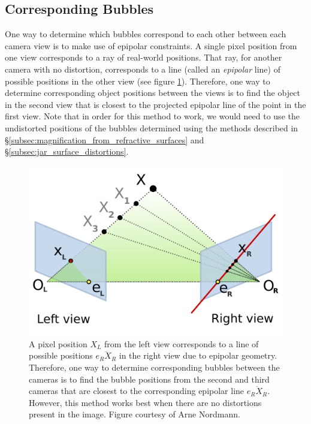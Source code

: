 \documentclass[11pt, letterpaper]{extarticle} %
\begin{document}
\subsection{Corresponding Bubbles} \label{subsec:corresponding_bubbles}
One way to determine which bubbles correspond to each other between each camera view is to make use of epipolar constraints. A single pixel position from one view corresponds to a ray of real-world positions. That ray, for another camera with no distortion, corresponds to a line (called an \textit{epipolar} line) of possible positions in the other view (see figure \ref{fig:epipolar_geometry}). Therefore, one way to determine corresponding object positions between the views is to find the object in the second view that is closest to the projected epipolar line of the point in the first view. Note that in order for this method to work, we would need to use the undistorted positions of the bubbles determined using the methods described in \S\ref{subsec:magnification_from_refractive_surfaces} and \S\ref{subsec:jar_surface_distortions}.


\begin{figure}[h]
    \centering
    \includegraphics[width=0.5\linewidth]{epipolar_geometry.png}
    \caption{A pixel position $X_L$ from the left view corresponds to a line of possible positions $\overline{e_R X_R}$ in the right view due to epipolar geometry. Therefore, one way to determine corresponding bubbles between the cameras is to find the bubble positions from the second and third cameras that are closest to the corresponding epipolar line $\overline{e_R X_R}$. However, this method works best when there are no distortions present in the image. Figure courtesy of Arne Nordmann.}
    \label{fig:epipolar_geometry}
\end{figure}
\end{document}
